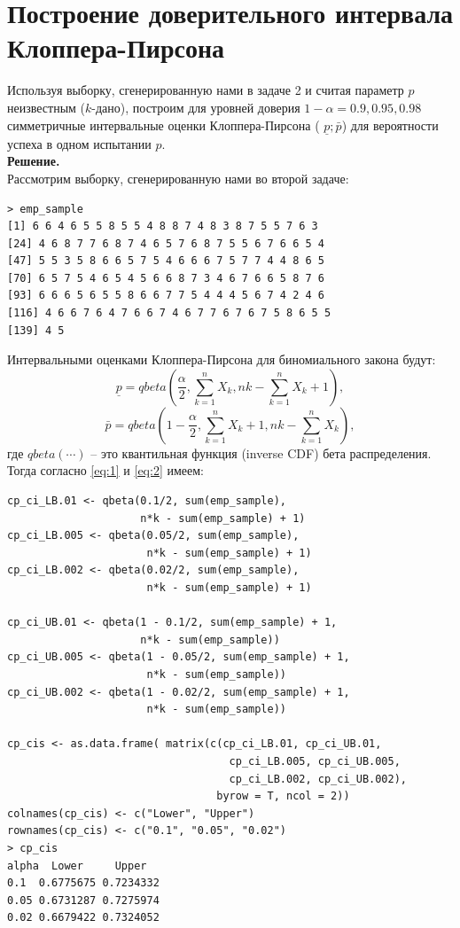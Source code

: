 \documentclass[14pt,a4paper]{scrartcl}
\begin{document}
\section{Построение доверительного интервала Клоппера-Пирсона}\label{sec1}
Используя выборку, сгенерированную нами в задаче 2 и считая параметр $p$ неизвестным ($k$-дано), построим для уровней доверия $1-\alpha=0.9, 0.95, 0.98$ симметричные интервальные оценки Клоппера-Пирсона ( $\underline{p};\bar{p}$) для вероятности успеха в одном испытании $p$. \\
\textbf{Решение.}\\
Рассмотрим выборку, сгенерированную нами во второй задаче:
\begin{verbatim}
> emp_sample
[1] 6 6 4 6 5 5 8 5 5 4 8 8 7 4 8 3 8 7 5 5 7 6 3
[24] 4 6 8 7 7 6 8 7 4 6 5 7 6 8 7 5 5 6 7 6 6 5 4
[47] 5 5 3 5 8 6 6 5 7 5 4 6 6 6 7 5 7 7 4 4 8 6 5
[70] 6 5 7 5 4 6 5 4 5 6 6 8 7 3 4 6 7 6 6 5 8 7 6
[93] 6 6 6 5 6 5 5 8 6 6 7 7 5 4 4 4 5 6 7 4 2 4 6
[116] 4 6 6 7 6 4 7 6 6 7 4 6 7 7 6 7 6 7 5 8 6 5 5
[139] 4 5
\end{verbatim}
Интервальными оценками Клоппера-Пирсона для биномиального закона будут:
\begin{equation}\label{eq:1}
	\underline{p}=q b e t a\left(\frac{\alpha}{2}, \sum_{k=1}^{n} X_{k}, n k-\sum_{k=1}^{n} X_{k}+1\right),
\end{equation}
\begin{equation}\label{eq:2}
	\bar{p}=q b e t a\left(1-\frac{\alpha}{2}, \sum_{k=1}^{n} X_{k}+1, n k-\sum_{k=1}^{n} X_{k}\right),
\end{equation}
где $qbeta(\cdots)$ -- это квантильная функция (inverse CDF) бета распределения. \\
Тогда согласно \ref{eq:1} и \ref{eq:2} имеем:
\begin{verbatim}
cp_ci_LB.01 <- qbeta(0.1/2, sum(emp_sample), 
                     n*k - sum(emp_sample) + 1)
cp_ci_LB.005 <- qbeta(0.05/2, sum(emp_sample), 
                      n*k - sum(emp_sample) + 1)
cp_ci_LB.002 <- qbeta(0.02/2, sum(emp_sample), 
                      n*k - sum(emp_sample) + 1)

cp_ci_UB.01 <- qbeta(1 - 0.1/2, sum(emp_sample) + 1, 
                     n*k - sum(emp_sample))
cp_ci_UB.005 <- qbeta(1 - 0.05/2, sum(emp_sample) + 1, 
                      n*k - sum(emp_sample))
cp_ci_UB.002 <- qbeta(1 - 0.02/2, sum(emp_sample) + 1, 
                      n*k - sum(emp_sample))

cp_cis <- as.data.frame( matrix(c(cp_ci_LB.01, cp_ci_UB.01,
                                   cp_ci_LB.005, cp_ci_UB.005,
                                   cp_ci_LB.002, cp_ci_UB.002), 
                                 byrow = T, ncol = 2))
colnames(cp_cis) <- c("Lower", "Upper")
rownames(cp_cis) <- c("0.1", "0.05", "0.02")
> cp_cis
alpha  Lower     Upper
0.1  0.6775675 0.7234332
0.05 0.6731287 0.7275974
0.02 0.6679422 0.7324052
\end{verbatim}
\end{document}
